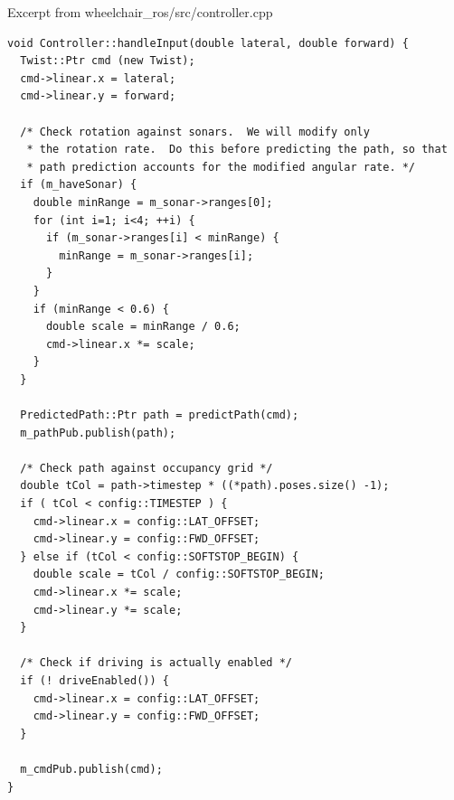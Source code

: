 \documentclass[oneside,final,a4paper]{report}
\begin{document}
Excerpt from wheelchair\_ros/src/controller.cpp
\begin{lstlisting}
void Controller::handleInput(double lateral, double forward) {
  Twist::Ptr cmd (new Twist);
  cmd->linear.x = lateral;
  cmd->linear.y = forward;

  /* Check rotation against sonars.  We will modify only
   * the rotation rate.  Do this before predicting the path, so that
   * path prediction accounts for the modified angular rate. */
  if (m_haveSonar) {
    double minRange = m_sonar->ranges[0];
    for (int i=1; i<4; ++i) {
      if (m_sonar->ranges[i] < minRange) {
        minRange = m_sonar->ranges[i];
      }
    }
    if (minRange < 0.6) {
      double scale = minRange / 0.6;
      cmd->linear.x *= scale;
    }
  }

  PredictedPath::Ptr path = predictPath(cmd);
  m_pathPub.publish(path);

  /* Check path against occupancy grid */
  double tCol = path->timestep * ((*path).poses.size() -1);
  if ( tCol < config::TIMESTEP ) {
    cmd->linear.x = config::LAT_OFFSET;
    cmd->linear.y = config::FWD_OFFSET;
  } else if (tCol < config::SOFTSTOP_BEGIN) {
    double scale = tCol / config::SOFTSTOP_BEGIN;
    cmd->linear.x *= scale;
    cmd->linear.y *= scale;
  } 

  /* Check if driving is actually enabled */
  if (! driveEnabled()) {
    cmd->linear.x = config::LAT_OFFSET;
    cmd->linear.y = config::FWD_OFFSET;
  }

  m_cmdPub.publish(cmd);
}
\end{lstlisting}
\end{document}
